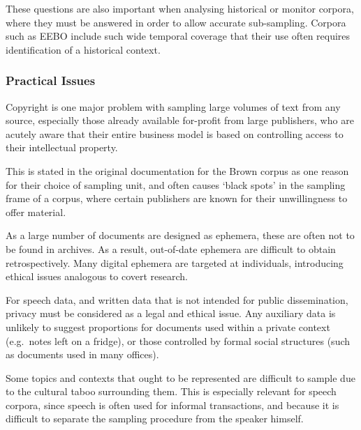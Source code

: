 These questions are also important when analysing historical or monitor corpora, where they must be answered in order to allow accurate sub-sampling.  Corpora such as EEBO\cite{blum2002early} include such wide temporal coverage that their use often requires identification of a historical context.







\subsubsection{Practical Issues}
Copyright is one major problem with sampling large volumes of text from any source, especially those already available for-profit from large publishers, who are acutely aware that their entire business model is based on controlling access to their intellectual property.

This is stated in the original documentation for the Brown corpus as one reason for their choice of sampling unit, and often causes `black spots' in the sampling frame of a corpus, where certain publishers are known for their unwillingness to offer material\cite{tonymceneryandrewhardie2011}.

%

As a large number of documents are designed as ephemera, these are often not to be found in archives.  As a result, out-of-date ephemera are difficult to obtain retrospectively.  Many digital ephemera are targeted at individuals, introducing ethical issues analogous to covert research.

For speech data, and written data that is not intended for public dissemination, privacy must be considered as a legal and ethical issue.  Any auxiliary data is unlikely to suggest proportions for documents used within a private context (e.g.\ notes left on a fridge), or those controlled by formal social structures (such as documents used in many offices).

Some topics and contexts that ought to be represented are difficult to sample due to the cultural taboo surrounding them. This is especially relevant for speech corpora, since speech is often used for informal transactions, and because it is difficult to separate the sampling procedure from the speaker himself.

